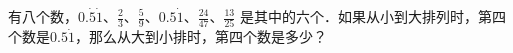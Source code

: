 
有八个数，$0.\dot{5}\dot{1}$、$\frac{2}{3}$、$\frac{5}{9}$、$0.5\dot{1}$、$\frac{24}{47}$、$\frac{13}{25}$ 是其中的六个．如果从小到大排列时，第四个数是$0.5\dot{1}$，那么从大到小排时，第四个数是多少？\\

